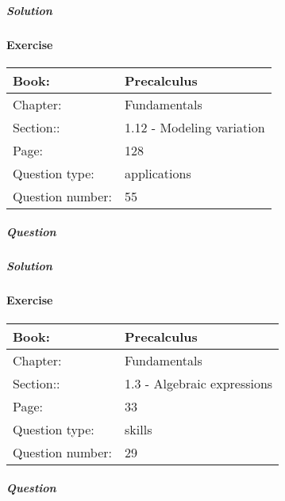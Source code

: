 \documentclass{article}
\begin{document}
            \subparagraph{Solution}
            
            
            \newpage
            \paragraph{Exercise}\par
            \noindent
            \begin{tabularx}{1\textwidth}{
                    p{}
                    p{}
                }
                \toprule
                Book: & Precalculus
                \\
                \midrule
                Chapter: & Fundamentals
                \\
                \midrule
                Section:: & 1.12 - Modeling variation
                \\
                \midrule
                Page: & 128
                \\
                \midrule
                Question type: & applications
                \\
                \midrule
                Question number: & 55
                \\
                \bottomrule
            \end{tabularx}
            \subparagraph{Question}
            
            \subparagraph{Solution}
            
            
            \newpage
            \paragraph{Exercise}\par
            \noindent
            \begin{tabularx}{1\textwidth}{
                    p{}
                    p{}
                }
                \toprule
                Book: & Precalculus
                \\
                \midrule
                Chapter: & Fundamentals
                \\
                \midrule
                Section:: & 1.3 - Algebraic expressions
                \\
                \midrule
                Page: & 33
                \\
                \midrule
                Question type: & skills
                \\
                \midrule
                Question number: & 29
                \\
                \bottomrule
            \end{tabularx}
            \subparagraph{Question}
            
\end{document}
